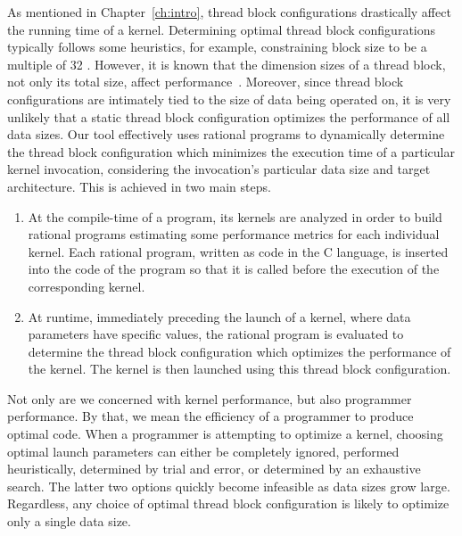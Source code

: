 As mentioned in Chapter~\ref{ch:intro}, 
thread block configurations drastically affect the running time of a kernel.
Determining optimal thread block configurations typically follows some heuristics, for example, 
constraining block size to be a multiple of 32 \cite{cuda2016best}. However, it is known
that the dimension sizes of a thread block, not only its total size, affect performance~\cite{DBLP:journals/tjs/TorresGL13,DBLP:conf/cascon/ChenCKMX15}.
Moreover, since thread block configurations are intimately tied to the size of data being operated on,
it is very unlikely that a static thread block configuration optimizes the performance 
of all data sizes. Our tool effectively uses rational programs to 
dynamically determine the thread block configuration 
which minimizes the execution time of a particular 
kernel invocation, considering
the invocation's particular data size 
and target architecture. 
This is achieved in two main steps. 
\begin{enumerate}
	\item At the compile-time of a {\cuda} program, its kernels are analyzed in order to
	build rational programs estimating some performance metrics for each individual kernel.
	Each rational program, written as code in the C language,
	is inserted into the code of the {\cuda} program
	so that it is called before the execution of the corresponding kernel.
	\item At runtime, immediately preceding the launch of a kernel, where data parameters have specific values, the rational program is evaluated to 
	determine the thread block configuration which optimizes the performance of the kernel. The kernel
	is then launched using this thread block configuration. 
\end{enumerate} 

Not only are we concerned with kernel performance, but also
programmer performance. By that, 
we mean the efficiency of a programmer to produce 
optimal code. When a programmer is attempting to optimize a kernel, choosing optimal launch
parameters can either be completely ignored, 
performed heuristically, determined by trial and error, or determined by an exhaustive search.
The latter two options quickly become infeasible as data sizes grow large.
Regardless, any choice of optimal thread block configuration is likely to optimize
only a single data size. 

